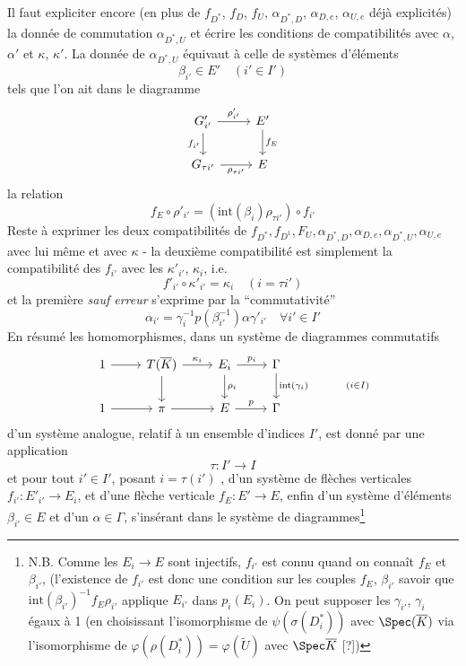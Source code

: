 Il faut expliciter encore (en plus de $f_{D^*}$, $f_D$, $f_U$, $\alpha_{D^*, D}$, $\alpha_{D, e}$, $\alpha_{U, e}$ déjà explicités) la donnée de commutation $\alpha_{D^*, U}$ et écrire les conditions de compatibilités avec $\alpha$, $\alpha'$ et $\kappa$, $\kappa'$. La donnée de $\alpha_{D^*, U}$ équivaut à celle de systèmes d'éléments
$$
\boxed{\beta_{i'} \in E'} \quad (i' \in I')
$$
tels que l'on ait dans le diagramme
\[\begin{tikzcd}
	{G'_{i'}} & {E'} \\
	{G_{\tau i'}} & E
	\arrow["{f_{i'}}"', from=1-1, to=2-1]
	\arrow["{\rho'_{i'}}", from=1-1, to=1-2]
	\arrow["{\rho_{\tau i'}}"', from=2-1, to=2-2]
	\arrow["{f_E}", from=1-2, to=2-2]
\end{tikzcd}\]
la relation
$$
f_E \circ \rho'_{i'} = (\text{int}(\beta_i)\rho_{\tau i'}) \circ f_{i'}
$$
Reste à exprimer les deux compatibilités de $f_{D^*}, f_{D^1}, F_U, \alpha_{D^*, D}, \alpha_{D, e}, \alpha_{D^*, U}, \alpha_{U, e}$ avec lui même et avec $\kappa$ - la deuxième compatibilité est simplement la compatibilité des $f_{i'}$ avec les $\kappa'_{i'}$, $\kappa_i$, i.e.
$$
f'_{i'} \circ \kappa'_{i'} = \kappa_i \quad (i = \tau i')
$$
et la première \emph{sauf erreur} s'exprime par la ``commutativité''
$$
\boxed{\alpha_{i'} = \gamma^{-1}_i p(\beta^{-1}_{i'}) \alpha \gamma'_{i'}} \quad \forall i' \in I'
$$
En résumé les homomorphismes, dans un système de diagrammes commutatifs
\[\begin{tikzcd}
	1 & {T(\overline{K})} & {E_i} & \Gamma \\
	1 & \pi & E & \Gamma
	\arrow[from=1-1, to=1-2]
	\arrow[from=2-1, to=2-2]
	\arrow[from=1-2, to=2-2]
	\arrow["{\kappa_i}", from=1-2, to=1-3]
	\arrow["{p_i}", from=1-3, to=1-4]
	\arrow["{\rho_i}", from=1-3, to=2-3]
	\arrow[from=2-2, to=2-3]
	\arrow["p", from=2-3, to=2-4]
	\arrow["{\text{int}(\gamma_i) \quad \quad \quad (i \in I)}", from=1-4, to=2-4]
\end{tikzcd}\]
d'un système analogue, relatif à un ensemble d'indices $I'$, est donné par une application
$$
\tau: I' \to I
$$
et pour tout $i' \in I'$, posant $i = \tau(i')$ , d'un système de flèches verticales $f_{i'}: E'_{i'} \to E_i$, et d'une flèche verticale $f_E: E' \to E$, enfin d'un système d'éléments $\beta_{i'} \in E$ et d'un $\alpha \in \Gamma$, s'insérant dans le système de diagrammes\footnote{N.B. Comme les $E_i \to E$ sont injectifs, $f_{i'}$ est connu quand on connaît $f_E$ et $\beta_{i'}$, (l'existence de $f_{i'}$ est donc une condition sur les couples $f_E$, $\beta_{i'}$ savoir que $\text{int}(\beta_{i'})^{-1}f_E \rho_{i'}$ applique $E_{i'}$ dans $p_i(E_i)$. On peut supposer les $\gamma_{i'}$, $\gamma_i$ égaux à 1 (en choisissant l'isomorphisme de $\psi(\sigma(D^*_i))$ avec $\Spec(\overline{K})$ via l'isomorphisme de $\varphi(\rho(D^*_i)) = \varphi(\widetilde{U})$ avec $\Spec \overline{K}$ [?])}

